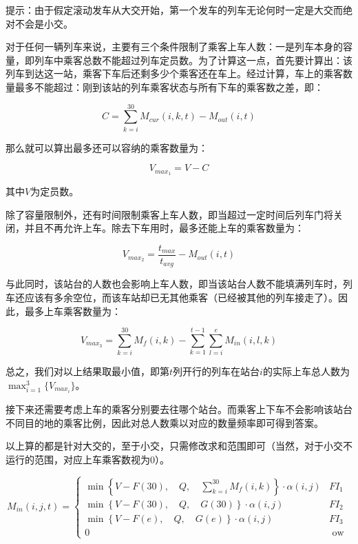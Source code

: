 提示：由于假定滚动发车从大交开始，第一个发车的列车无论何时一定是大交而绝对不会是小交。

对于任何一辆列车来说，主要有三个条件限制了乘客上车人数：一是列车本身的容量，即列车中乘客总数不能超过列车定员数。为了计算这一点，首先要计算出：该列车到达这一站，乘客下车后还剩多少个乘客还在车上。经过计算，车上的乘客数量最多不能超过：刚到该站的列车乘客状态与所有下车的乘客数之差，即：

\begin{equation}
C = \sum _{k = i} ^{30} M_{cur}(i, k, t) - M_{out}(i, t)
\end{equation}

那么就可以算出最多还可以容纳的乘客数量为：

\begin{equation}
    V_{max_1} = V-C
\end{equation}

其中$V$为定员数。

除了容量限制外，还有时间限制乘客上车人数，即当超过一定时间后列车门将关闭，并且不再允许上车。除去下车用时，最多还能上车的乘客数量为：

\begin{equation}
V_{max_2} = \frac {t_{max}} {t_{avg}} - M_{out}(i, t)
\end{equation}

与此同时，该站台的人数也会影响上车人数，即当该站台人数不能填满列车时，列车还应该有多余空位，而该车站却已无其他乘客（已经被其他的列车接走了）。因此，最多上车乘客数量为：

\begin{equation}
V_{max_3} = \sum _{k = i} ^{30} M_f(i, k) - \sum _{k = 1} ^{t - 1} \sum _{l = i} ^{e} M_{in}(i, l, k)
\end{equation}

总之，我们对以上结果取最小值，即第$t$列开行的列车在站台$i$的实际上车总人数为$\max _{i = 1} ^{3} \{V_{max_i}\}$。

接下来还需要考虑上车的乘客分别要去往哪个站台。而乘客上下车不会影响该站台不同目的地的乘客比例，因此对总人数乘以对应的数量频率即可得到答案。

以上算的都是针对大交的，至于小交，只需修改求和范围即可（当然，对于小交不运行的范围，对应上车乘客数视为$0$）。

\begin{equation}
M_{in}(i, j, t) = 
	\begin{cases}
	\min \left\{
	 	V - F(30), \quad
	  	Q, \quad
	  	\sum _{k = i} ^{30} M_f(i, k)
	\right\} \cdot \alpha(i, j) &  FI_1\\
	\min \left\{
	 	V - F(30), \quad
	  	Q, \quad
        G(30)
	\right\} \cdot \alpha(i, j) &  FI_2\\
	\min \left\{
	 	V - F(e), \quad
	  	Q, \quad
        G(e)
	\right\} \cdot \alpha(i, j) &  FI_3\\
	0 & \text{ ow } 
	\end{cases}
\end{equation}

